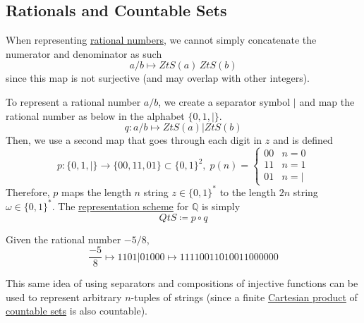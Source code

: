 \subsection{Rationals and Countable Sets}
  
  When representing \hyperref[alg-def:rational-numbers]{rational numbers}, we cannot simply concatenate the numerator and denominator as such
  \begin{equation}
    a/b \mapsto ZtS(a) \, ZtS(b)
  \end{equation}
  since this map is not surjective (and may overlap with other integers). 

  \begin{definition}
    \label{def:representation-of-rationals}
    To represent a rational number $a/b$, we create a separator symbol $|$ and map the rational number as below in the alphabet $\{0, 1, |\}$. 
    \begin{equation}
      q: a/b \mapsto ZtS(a) | ZtS(b)
    \end{equation}
    Then, we use a second map that goes through each digit in $z$ and is defined 
    \begin{equation}
      p: \{0, 1, |\} \to \{00,11,01\} \subset \{0, 1\}^2, \; p(n) = \begin{cases}
          00 & n = 0 \\
          11 & n = 1 \\
          01 & n = |
          \end{cases}
    \end{equation}
    Therefore, $p$ maps the length $n$ string $z \in \{0, 1\}^\ast$ to the length $2n$ string $\omega \in \{0, 1\}^\ast$. The \hyperref[def:representation-scheme]{representation scheme} for $\mathbb{Q}$ is simply 
    \begin{equation}
      QtS \coloneqq p \circ q
    \end{equation}
  \end{definition}

  \begin{example}
    \label{ex:encoding-the-rational-58}
  Given the rational number $-5/8$,
  \begin{equation}
    \frac{-5}{8} \mapsto 1101|01000 \mapsto 11110011010011000000
  \end{equation}
  \end{example}

  This same idea of using separators and compositions of injective functions can be used to represent arbitrary $n$-tuples of strings (since a finite \hyperref[st-def:cart-prod-2]{Cartesian product} of \hyperref[st-def:countable]{countable sets} is also countable). 

